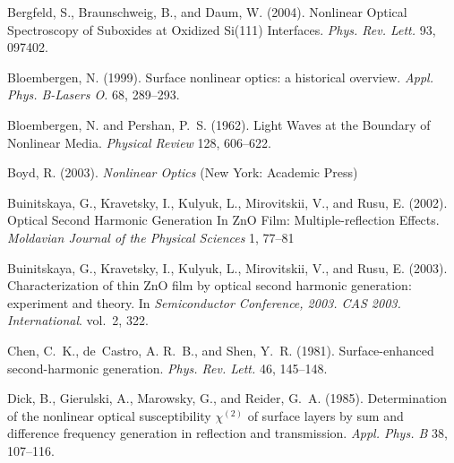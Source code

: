 \documentclass[utf8]{frontiersSCNS}
\begin{document}
\begin{thebibliography}{39}
Bergfeld, S., Braunschweig, B., and Daum, W. (2004).
\newblock Nonlinear {Optical} {Spectroscopy} of {Suboxides} at {Oxidized}
  {Si}(111) {Interfaces}.
\newblock \emph{Phys. Rev. Lett.} 93, 097402.
\newblock {}

Bloembergen, N. (1999).
\newblock Surface nonlinear optics: a historical overview.
\newblock \emph{Appl. Phys. B-Lasers O.} 68, 289--293.
\newblock {}

Bloembergen, N. and Pershan, P.~S. (1962).
\newblock Light {Waves} at the {Boundary} of {Nonlinear} {Media}.
\newblock \emph{Physical Review} 128, 606--622.
\newblock {}

Boyd, R. (2003).
\newblock \emph{Nonlinear Optics} (New York: Academic Press)

Buinitskaya, G., Kravetsky, I., Kulyuk, L., Mirovitskii, V., and Rusu, E.
  (2002).
\newblock Optical {Second} {Harmonic} {Generation} {In} {ZnO} {Film}:
  {Multiple}-reflection {Effects}.
\newblock \emph{Moldavian Journal of the Physical Sciences} 1, 77--81

Buinitskaya, G., Kravetsky, I., Kulyuk, L., Mirovitskii, V., and Rusu, E.
  (2003).
\newblock Characterization of thin {ZnO} film by optical second harmonic
  generation: experiment and theory.
\newblock In \emph{Semiconductor Conference, 2003. CAS 2003. International}.
  vol.~2, 322.
\newblock {}

Chen, C.~K., de~Castro, A. R.~B., and Shen, Y.~R. (1981).
\newblock Surface-enhanced second-harmonic generation.
\newblock \emph{Phys. Rev. Lett.} 46, 145--148.
\newblock {}

Dick, B., Gierulski, A., Marowsky, G., and Reider, G.~A. (1985).
\newblock Determination of the nonlinear optical susceptibility $\chi^{(2)}$ of
  surface layers by sum and difference frequency generation in reflection and
  transmission.
\newblock \emph{Appl. Phys. B} 38, 107--116.
\newblock {}


\end{thebibliography}
\end{document}
